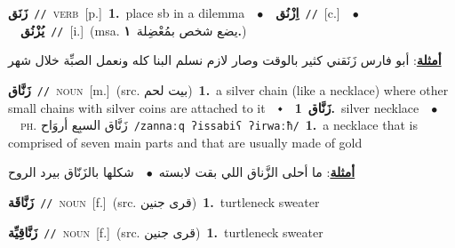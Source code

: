 \documentclass[10pt,a4paper,twoside]{article} %
\begin{document}
\begin{multicols}{2}
{\setlength\topsep{0pt}\textbf{\foreignlanguage{arabic}{زَنَق}}\ {\color{gray}\texttt{//}\color{black}}\ \textsc{verb}\ [p.]\ \textbf{1.}~place sb in a dilemma\ \ $\bullet$\ \ \setlength\topsep{0pt}\textbf{\foreignlanguage{arabic}{اِزْنُق}}\ {\color{gray}\texttt{//}\color{black}}\ [c.]\ \ $\bullet$\ \ \setlength\topsep{0pt}\textbf{\foreignlanguage{arabic}{يُزْنُق}}\ {\color{gray}\texttt{//}\color{black}}\ [i.]\ \color{gray}(msa. \foreignlanguage{arabic}{يضع شخص بمُعْضِلة}~\foreignlanguage{arabic}{\textbf{١.}})\color{black}\  \begin{flushright}\color{gray}\foreignlanguage{arabic}{\textbf{\underline{\foreignlanguage{arabic}{أمثلة}}}: أبو فارس زَنَقني كثير بالوقت وصار لازم نسلم البنا كله ونعمل الصبِّة خلال شهر}\end{flushright}\color{black}} \vspace{2mm}

{\setlength\topsep{0pt}\textbf{\foreignlanguage{arabic}{زَنَّاق}}\ {\color{gray}\texttt{//}\color{black}}\ \textsc{noun}\ [m.]\ (src. \color{gray}\foreignlanguage{arabic}{بيت لحم}\color{black})\ \textbf{1.}~a silver chain (like a necklace) where other small chains with silver coins are attached to it\ \ $\smblkdiamond$\ \ \setlength\topsep{0pt}\textbf{\foreignlanguage{arabic}{زَنَّاق}}\ \textbf{1.}~silver necklace\ \ $\bullet$\ \ \textsc{ph.} \color{gray} \foreignlanguage{arabic}{زَنَّاق السبِع أروَاح}\color{black}\ {\color{gray}\texttt{/{\sffamily zannaːq ʔissabiʕ ʔirwaːħ}/}\color{black}}\ \textbf{1.}~a necklace that is comprised of seven main parts and that are usually made of gold\  \begin{flushright}\color{gray}\foreignlanguage{arabic}{\textbf{\underline{\foreignlanguage{arabic}{أمثلة}}}: ما أحلى الزَّناق اللي بقت لابسته\ $\bullet$\ \  شكلها بالزَنّاق بيرد الروح}\end{flushright}\color{black}} \vspace{2mm}

{\setlength\topsep{0pt}\textbf{\foreignlanguage{arabic}{زَنَّاقَة}}\ {\color{gray}\texttt{//}\color{black}}\ \textsc{noun}\ [f.]\ (src. \color{gray}\foreignlanguage{arabic}{قرى جنين}\color{black})\ \textbf{1.}~turtleneck sweater\ } \vspace{2mm}

{\setlength\topsep{0pt}\textbf{\foreignlanguage{arabic}{زَنَّاقِيِّة}}\ {\color{gray}\texttt{//}\color{black}}\ \textsc{noun}\ [f.]\ (src. \color{gray}\foreignlanguage{arabic}{قرى جنين}\color{black})\ \textbf{1.}~turtleneck sweater\ } \vspace{2mm}


\end{multicols}
\end{document}
